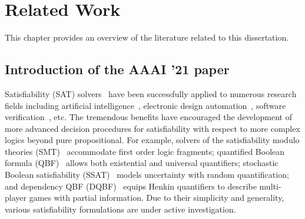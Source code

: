 \chapter{Related Work}
\label{chap:related-work}

This chapter provides an overview of the literature related to this dissertation.




\iffalse
    with pruning heuristics and subproblem memorization
    For example, \maxplan~\cite{Majercik1998} improves the DPLL-based search by considering pure literal, unit propagation, and subproblem memorization;
    \zander~\cite{Majercik2003} incorporates several threshold pruning heuristics to reduce the search space;
    \dcssat~\cite{Majercik2005} divides the SSAT formulas into many subproblems and conquer them separately.
\fi

\iffalse
    \section{Introduction of the AAAI '21 paper}
    Satisfiability (SAT) solvers~\cite{SATHandbook} have been successfully applied to numerous research fields including artificial intelligence~\cite{Nilsson2014,Russell2020}, electronic design automation~\cite{Marques2000,Wang2009}, software verification~\cite{Jhala2009, Berard2013}, etc.
    The tremendous benefits have encouraged the development of more advanced decision procedures for satisfiability with respect to more complex logics beyond pure propositional.
    For example, solvers of the satisfiability modulo theories (SMT)~\cite{Moura2011,HBMC-SMT} accommodate first order logic fragments; quantified Boolean formula (QBF)~\cite{Narizzano2006,SATHandbook-QBF} allows both existential and universal quantifiers; stochastic Boolean satisfiability (SSAT)~\cite{Littman2001,SATHandbook-SSAT} models uncertainty with random quantification; and dependency QBF (DQBF)~\cite{Balabanov2014,Scholl2018} equips Henkin quantifiers to describe multi-player games with partial information.
    Due to their simplicity and generality, various satisfiability formulations are under active investigation.

